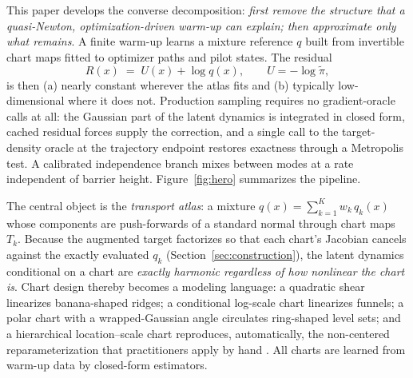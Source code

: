 \documentclass[11pt]{article}
\theoremstyle{remark}
\begin{document}
This paper develops the converse decomposition: \emph{first remove the
structure that a quasi-Newton, optimization-driven warm-up can explain;
then approximate only what remains}. A finite warm-up learns a mixture
reference $q$ built from invertible chart maps fitted to optimizer paths
and pilot states. The residual
\begin{equation}
R(x)\;=\;U(x)+\log q(x),\qquad U=-\log\tilde\pi,
\label{eq:residual}
\end{equation}
is then (a) nearly constant wherever the atlas fits and (b) typically
low-dimensional where it does not. Production sampling requires no
gradient-oracle calls at all: the Gaussian part of the latent dynamics is
integrated in closed form, cached residual forces supply the correction,
and a single call to the target-density oracle at the trajectory endpoint
restores exactness through a Metropolis test. A calibrated independence
branch mixes between modes at a rate independent of barrier height.
Figure~\ref{fig:hero} summarizes the pipeline.

The central object is the \emph{transport atlas}: a mixture
$q(x)=\sum_{k=1}^Kw_k\,q_k(x)$ whose components are push-forwards of a
standard normal through chart maps $T_k$. Because the augmented target
factorizes so that each chart's Jacobian cancels against the exactly
evaluated $q_k$ (Section~\ref{sec:construction}), the latent dynamics
conditional on a chart are \emph{exactly harmonic regardless of how
nonlinear the chart is}. Chart design thereby becomes a modeling language:
a quadratic shear linearizes banana-shaped ridges; a conditional log-scale
chart linearizes funnels; a polar chart with a wrapped-Gaussian angle
circulates ring-shaped level sets; and a hierarchical location--scale chart
reproduces, automatically, the non-centered reparameterization that
practitioners apply by hand
\citep{papaspiliopoulos2007,betancourt2015}. All charts are learned from
warm-up data by closed-form estimators.
\end{document}
